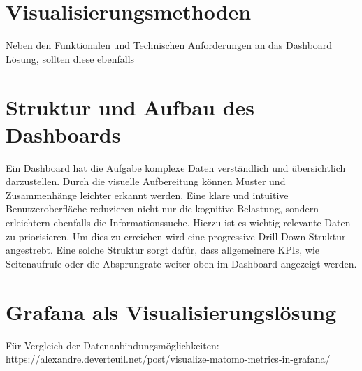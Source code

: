 \section{Visualisierungsmethoden}
Neben den Funktionalen und Technischen Anforderungen an das Dashboard Lösung, sollten diese ebenfalls  

\section{Struktur und Aufbau des Dashboards}
Ein Dashboard hat die Aufgabe komplexe Daten verständlich und übersichtlich darzustellen. Durch die visuelle Aufbereitung können Muster und Zusammenhänge leichter erkannt werden. Eine klare und intuitive Benutzeroberfläche reduzieren nicht nur die kognitive Belastung, sondern erleichtern ebenfalls die Informationssuche. Hierzu ist es wichtig relevante Daten zu priorisieren. Um dies zu erreichen wird eine progressive Drill-Down-Struktur angestrebt. Eine solche Struktur sorgt dafür, dass allgemeinere KPIs, wie Seitenaufrufe oder die Absprungrate weiter oben im Dashboard angezeigt werden.
\section{Grafana als Visualisierungslösung}
Für Vergleich der Datenanbindungsmöglichkeiten: https://alexandre.deverteuil.net/post/visualize-matomo-metrics-in-grafana/













